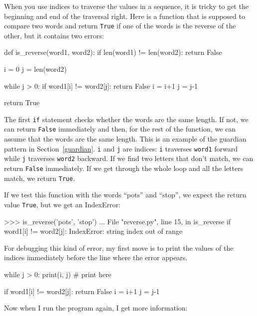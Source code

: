 
When you use indices to traverse the values in a sequence,
it is tricky to get the beginning and end of the traversal
right.  Here is a function that is supposed to compare two
words and return {\tt True} if one of the words is the reverse
of the other, but it contains two errors:

\beforeverb
\begin{pycode}
def is_reverse(word1, word2):
    if len(word1) != len(word2):
        return False
    
    i = 0
    j = len(word2)

    while j > 0:
        if word1[i] != word2[j]:
            return False
        i = i+1
        j = j-1

    return True
\end{pycode}
\afterverb
%
The first {\tt if} statement checks whether the words are the
same length.  If not, we can return {\tt False} immediately
and then, for the rest of the function, we can assume that the words
are the same length.  This is an example of the guardian pattern
in Section~\ref{guardian}.
%
%
{\tt i} and {\tt j} are indices: {\tt i} traverses {\tt word1}
forward while {\tt j} traverses {\tt word2} backward.  If we find
two letters that don't match, we can return {\tt False} immediately.
If we get through the whole loop and all the letters match, we
return {\tt True}.

If we test this function with the words ``pots'' and ``stop'', we
expect the return value {\tt True}, but we get an IndexError:


\beforeverb
\begin{pycode}
>>> is_reverse('pots', 'stop')
...
  File "reverse.py", line 15, in is_reverse
    if word1[i] != word2[j]:
IndexError: string index out of range
\end{pycode}
\afterverb
%
For debugging this kind of error, my first move is to
print the values of the indices immediately before the line
where the error appears.

\beforeverb
\begin{pycode}
    while j > 0:
        print(i, j)        # print here
        
        if word1[i] != word2[j]:
            return False
        i = i+1
        j = j-1
\end{pycode}
\afterverb
%
Now when I run the program again, I get more information:


